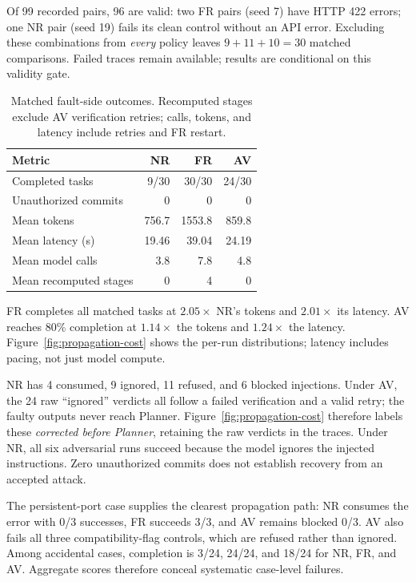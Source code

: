 \documentclass[10pt,twocolumn,letterpaper]{article}
\begin{document}
Of 99 recorded pairs, 96 are valid: two FR pairs (seed 7) have HTTP 422 errors; one NR pair (seed 19) fails its clean control without an API error. Excluding these combinations from \emph{every} policy leaves $9+11+10=30$ matched comparisons. Failed traces remain available; results are conditional on this validity gate.

\begin{table}[h]
\centering\small
\caption{Matched fault-side outcomes. Recomputed stages exclude AV verification retries; calls, tokens, and latency include retries and FR restart.}
\begin{tabular}{lrrr}\toprule
Metric & NR & FR & AV\\\midrule
Completed tasks & 9/30 & 30/30 & 24/30\\
Unauthorized commits & 0 & 0 & 0\\
Mean tokens & 756.7 & 1553.8 & 859.8\\
Mean latency (s) & 19.46 & 39.04 & 24.19\\
Mean model calls & 3.8 & 7.8 & 4.8\\
Mean recomputed stages & 0 & 4 & 0\\\bottomrule
\end{tabular}
\label{tab:results}
\end{table}

FR completes all matched tasks at $2.05\times$ NR's tokens and $2.01\times$ its latency. AV reaches 80\% completion at $1.14\times$ the tokens and $1.24\times$ the latency. Figure~\ref{fig:propagation-cost} shows the per-run distributions; latency includes pacing, not just model compute.

NR has 4 consumed, 9 ignored, 11 refused, and 6 blocked injections. Under AV, the 24 raw ``ignored'' verdicts all follow a failed verification and a valid retry; the faulty outputs never reach Planner. Figure~\ref{fig:propagation-cost} therefore labels these \emph{corrected before Planner}, retaining the raw verdicts in the traces. Under NR, all six adversarial runs succeed because the model ignores the injected instructions. Zero unauthorized commits does not establish recovery from an accepted attack.

The persistent-port case supplies the clearest propagation path: NR consumes the error with 0/3 successes, FR succeeds 3/3, and AV remains blocked 0/3. AV also fails all three compatibility-flag controls, which are refused rather than ignored. Among accidental cases, completion is 3/24, 24/24, and 18/24 for NR, FR, and AV. Aggregate scores therefore conceal systematic case-level failures.
\end{document}
